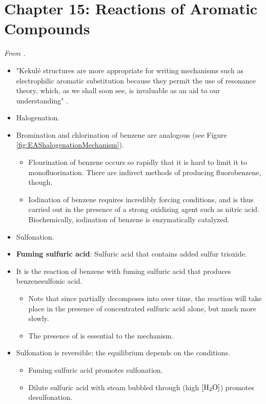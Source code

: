 \documentclass[../notes.tex]{subfiles}
\begin{document}
\section{Chapter 15: Reactions of Aromatic Compounds}
\emph{From \textcite{bib:SolomonsEtAl}.}
\begin{itemize}
    \item {}"Kekul\'{e} structures are more appropriate for writing mechanisms such as electrophilic aromatic substitution because they permit the use of resonance theory, which, as we shall soon see, is invaluable as an aid to our understanding" \parencite[663]{bib:SolomonsEtAl}.
    \item Halogenation.
    \item Bromination and chlorination of benzene are analogous (see Figure \ref{fig:EAShalogenationMechanism}).
    \begin{itemize}
        \item Flourination of benzene occurs so rapidly that it is hard to limit it to monofluorination. There are indirect methods of producing fluorobenzene, though.
        \item Iodination of benzene requires incredibly forcing conditions, and is thus carried out in the presence of a strong oxidizing agent such as nitric acid. Biochemically, iodination of benzene is enzymatically catalyzed.
    \end{itemize}
    \item Sulfonation.
    \item \textbf{Fuming sulfuric acid}: Sulfuric acid that contains added sulfur trioxide.
    \item It is the reaction of benzene with fuming sulfuric acid that produces benzenesulfonic acid.
    \begin{itemize}
        \item Note that since  partially decomposes into  over time, the reaction will take place in the presence of concentrated sulfuric acid alone, but much more slowly.
        \item The presence of  is essential to the mechanism.
    \end{itemize}
    \item Sulfonation is reversible; the equilibrium depends on the conditions.
    \begin{itemize}
        \item Fuming sulfuric acid promotes sulfonation.
        \item Dilute sulfuric acid with steam bubbled through (high $[\ce{H2O}]$) promotes desulfonation.

\end{itemize}
\end{itemize}
\end{document}
